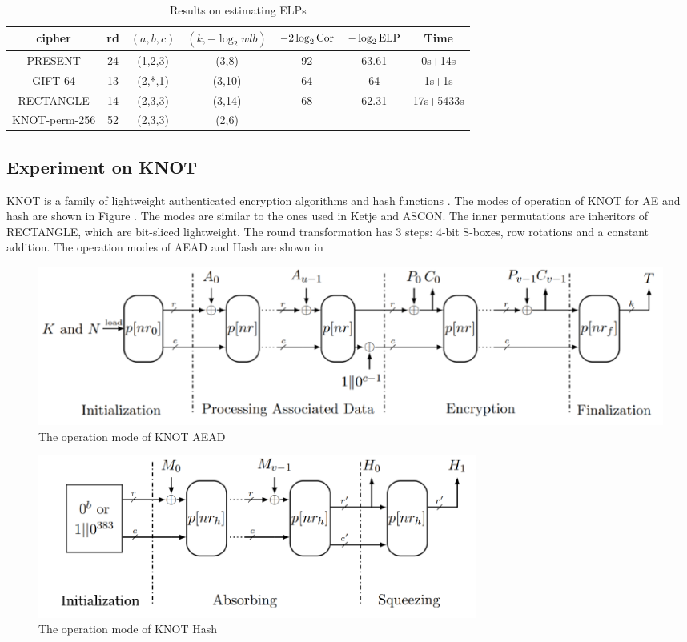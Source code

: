 \begin{table}
	\caption{Results on estimating ELPs}\label{tab:ELP}
	\centering
	\begin{tabular}{|c|c|c|c|c|c|c|}
		\hline
		cipher & rd & $(a,b,c)$ & $(k,-\log_2wlb)$ & $-2\log_2\text{Cor}$ & $-\log_2\text{ELP}$ & Time \\
		\hline
		PRESENT & 24 & (1,2,3) & (3,8) & 92 & 63.61 & 0s+14s\\
		\hline
		GIFT-64 & 13 & (2,*,1) & (3,10) & 64 & 64 & 1s+1s\\
		\hline 
		RECTANGLE & 14 & (2,3,3) & (3,14) & 68 & 62.31 & 17s+5433s \\
		\hline
		KNOT-perm-256 & 52 & (2,3,3) & (2,6) &  &  & \\
		\hline
	\end{tabular}
\end{table}



\subsection{Experiment on KNOT}

KNOT is a family of lightweight authenticated encryption algorithms and hash functions \cite{ZDY19}. The modes of operation of KNOT for AE and hash are shown in Figure . The modes are similar to the ones used in Ketje and ASCON. The inner permutations are inheritors of RECTANGLE, which are bit-sliced lightweight. The round transformation has 3 steps: 4-bit S-boxes, row rotations and a constant addition. The operation modes of AEAD and Hash are shown in 

\begin{figure}
	\centering
	\includegraphics[width=1\textwidth]{fig/mode_aead.PNG}
	\caption{The operation mode of KNOT AEAD} \label{fig:mode_aead}
\end{figure}

\begin{figure}
	\centering
	\includegraphics[width=0.7\textwidth]{fig/mode_hash.PNG}
	\caption{The operation mode of KNOT Hash} \label{fig:mode_hash}
\end{figure}

